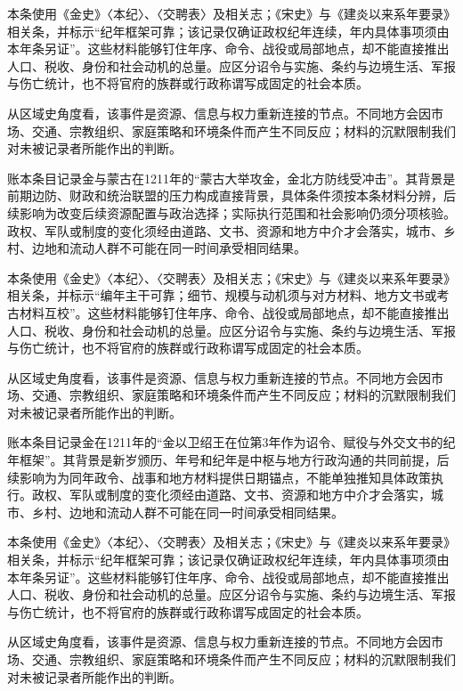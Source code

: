 本条使用《金史》〈本纪〉、〈交聘表〉及相关志；《宋史》与《建炎以来系年要录》相关条，并标示“纪年框架可靠；该记录仅确证政权纪年连续，年内具体事项须由本年条另证”。这些材料能够钉住年序、命令、战役或局部地点，却不能直接推出人口、税收、身份和社会动机的总量。应区分诏令与实施、条约与边境生活、军报与伤亡统计，也不将官府的族群或行政称谓写成固定的社会本质。

从区域史角度看，该事件是资源、信息与权力重新连接的节点。不同地方会因市场、交通、宗教组织、家庭策略和环境条件而产生不同反应；材料的沉默限制我们对未被记录者所能作出的判断。

账本条目记录金与蒙古在1211年的“蒙古大举攻金，金北方防线受冲击”。其背景是前期边防、财政和统治联盟的压力构成直接背景，具体条件须按本条材料分辨，后续影响为改变后续资源配置与政治选择；实际执行范围和社会影响仍须分项核验。政权、军队或制度的变化须经由道路、文书、资源和地方中介才会落实，城市、乡村、边地和流动人群不可能在同一时间承受相同结果。

本条使用《金史》〈本纪〉、〈交聘表〉及相关志；《宋史》与《建炎以来系年要录》相关条，并标示“编年主干可靠；细节、规模与动机须与对方材料、地方文书或考古材料互校”。这些材料能够钉住年序、命令、战役或局部地点，却不能直接推出人口、税收、身份和社会动机的总量。应区分诏令与实施、条约与边境生活、军报与伤亡统计，也不将官府的族群或行政称谓写成固定的社会本质。

从区域史角度看，该事件是资源、信息与权力重新连接的节点。不同地方会因市场、交通、宗教组织、家庭策略和环境条件而产生不同反应；材料的沉默限制我们对未被记录者所能作出的判断。

账本条目记录金在1211年的“金以卫绍王在位第3年作为诏令、赋役与外交文书的纪年框架”。其背景是新岁颁历、年号和纪年是中枢与地方行政沟通的共同前提，后续影响为为同年政令、战事和地方材料提供日期锚点，不能单独推知具体政策执行。政权、军队或制度的变化须经由道路、文书、资源和地方中介才会落实，城市、乡村、边地和流动人群不可能在同一时间承受相同结果。

本条使用《金史》〈本纪〉、〈交聘表〉及相关志；《宋史》与《建炎以来系年要录》相关条，并标示“纪年框架可靠；该记录仅确证政权纪年连续，年内具体事项须由本年条另证”。这些材料能够钉住年序、命令、战役或局部地点，却不能直接推出人口、税收、身份和社会动机的总量。应区分诏令与实施、条约与边境生活、军报与伤亡统计，也不将官府的族群或行政称谓写成固定的社会本质。

从区域史角度看，该事件是资源、信息与权力重新连接的节点。不同地方会因市场、交通、宗教组织、家庭策略和环境条件而产生不同反应；材料的沉默限制我们对未被记录者所能作出的判断。

